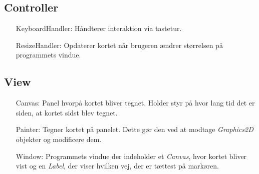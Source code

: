 \subsection{Controller}

\begin{itemize}
	\item [KeyboardHandler:] Håndterer interaktion via tastetur.
	\item [ResizeHandler:] Opdaterer kortet når brugeren ændrer størrelsen på programmets vindue.
\end{itemize}

\subsection{View}

\begin{itemize}
	\item [Canvas:] Panel hvorpå kortet bliver tegnet. Holder styr på hvor lang tid det er siden, at kortet sidst blev tegnet.
	\item [Painter:] Tegner kortet på panelet. Dette gør den ved at modtage \emph{Graphics2D} objekter og modificere dem.
	\item [Window:] Programmets vindue der indeholder et \emph{Canvas}, hvor kortet bliver vist og en \emph{Label}, der viser hvilken vej, der er tættest på markøren.
\end{itemize}